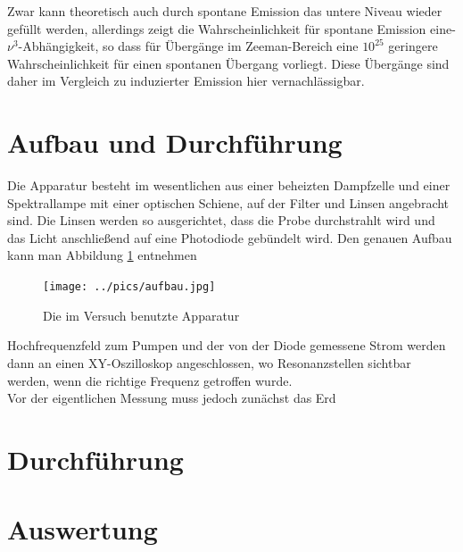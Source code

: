Zwar kann theoretisch auch durch spontane Emission das untere Niveau wieder gefüllt werden, allerdings zeigt die Wahrscheinlichkeit für spontane Emission eine-$\nu^3$-Abhängigkeit, so dass für Übergänge im Zeeman-Bereich eine $10^{25}$ geringere Wahrscheinlichkeit für einen spontanen Übergang vorliegt. Diese Übergänge sind daher im Vergleich zu induzierter Emission hier vernachlässigbar.

\section{Aufbau und Durchführung}
Die Apparatur besteht im wesentlichen aus einer beheizten Dampfzelle und einer Spektrallampe mit einer optischen Schiene, auf der Filter und Linsen angebracht sind. Die Linsen werden so ausgerichtet, dass die Probe durchstrahlt wird und das Licht anschließend auf eine Photodiode gebündelt wird. Den genauen Aufbau kann man Abbildung \ref{pic_aufbau} entnehmen
\begin{figure}
\texttt{[image: ../pics/aufbau.jpg]}
\caption{Die im Versuch benutzte Apparatur}
\label{pic_aufbau}
\end{figure}
Hochfrequenzfeld zum Pumpen und der von der Diode gemessene Strom werden dann an einen XY-Oszilloskop angeschlossen, wo Resonanzstellen sichtbar werden, wenn die richtige Frequenz getroffen wurde.\\

Vor der eigentlichen Messung muss jedoch zunächst das Erd





\section{Durchführung}
\label{sec_durch}

\section{Auswertung}
